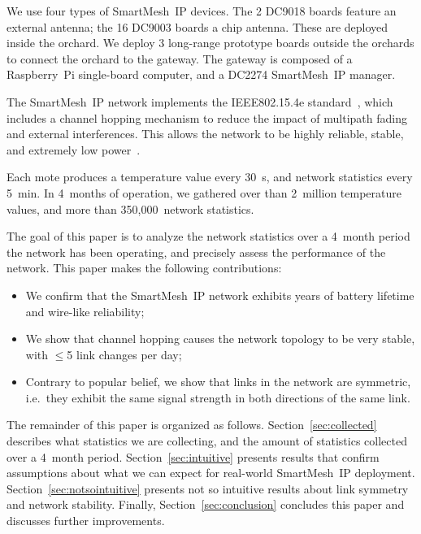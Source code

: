 \documentclass{sig-alternate}
\newcommand{\smip}                {SmartMesh~IP\xspace}
\begin{document}

We use four types of \smip devices.
The 2 DC9018 boards feature an external antenna; the 16 DC9003 boards a chip antenna.
These are deployed inside the orchard.
We deploy 3 long-range prototype boards outside the orchards to connect the orchard to the gateway.
The gateway is composed of a Raspberry~Pi single-board computer, and a DC2274 \smip manager.


The \smip network implements the IEEE802.15.4e standard~\cite{std_ieee802154e_2012}, which includes a channel hopping mechanism to reduce the impact of multipath fading and external interferences.
This allows the network to be highly reliable, stable, and extremely low power~\cite{watteyne10mitigating, watteyne09reliability}.


Each mote produces a temperature value every 30~s, and network statistics every 5~min.
In 4~months of operation, we gathered over than 2~million temperature values, and more than 350,000~network statistics.


The goal of this paper is to analyze the network statistics over a 4~month period the network has been operating, and precisely assess the performance of the network.
This paper makes the following contributions:
\begin{itemize}
    \item We confirm that the \smip network exhibits years of battery lifetime and wire-like reliability;
    \item We show that channel hopping causes the network topology to be very stable, with $\leq$5 link changes per day;
    \item Contrary to popular belief, we show that links in the network are symmetric, i.e.~they exhibit the same signal strength in both directions of the same link.
\end{itemize}


The remainder of this paper is organized as follows.
Section~\ref{sec:collected} describes what statistics we are collecting, and the amount of statistics collected over a 4~month period.
Section~\ref{sec:intuitive} presents results that confirm assumptions about what we can expect for real-world \smip deployment.
Section~\ref{sec:notsointuitive} presents not so intuitive results about link symmetry and network stability.
Finally, Section~\ref{sec:conclusion} concludes this paper and discusses further improvements.
\end{document}
